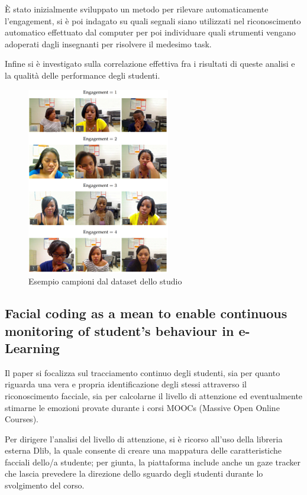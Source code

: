 È stato inizialmente sviluppato un metodo per rilevare automaticamente l’engagement, si è poi indagato su quali segnali siano utilizzati nel riconoscimento automatico effettuato dal computer per poi individuare quali strumenti vengano adoperati dagli insegnanti per risolvere il medesimo task.

Infine si è investigato sulla correlazione effettiva fra i risultati di queste analisi e la qualità delle performance degli studenti.

\begin{figure}
    \begin{center}    
        \includegraphics[width=0.4\linewidth]{images/2.png}
        \caption{Esempio campioni dal dataset dello studio}
    \end{center}
\end{figure}

\subsection{Facial coding as a mean to enable continuous monitoring of student’s behaviour in e-Learning }

Il paper \cite{FacialCodingContinMonitor} si focalizza sul tracciamento continuo degli studenti, sia per quanto riguarda una vera e propria identificazione degli stessi attraverso il riconoscimento facciale, sia per calcolarne il livello di attenzione ed eventualmente stimarne le emozioni provate durante i corsi MOOCs (Massive Open Online Courses).

Per dirigere l’analisi del livello di attenzione, si è ricorso all’uso della libreria esterna Dlib, la quale consente di creare una mappatura delle caratteristiche facciali dello/a studente; per giunta, la piattaforma include anche un gaze tracker che lascia prevedere la direzione dello sguardo degli studenti durante lo svolgimento del corso.

